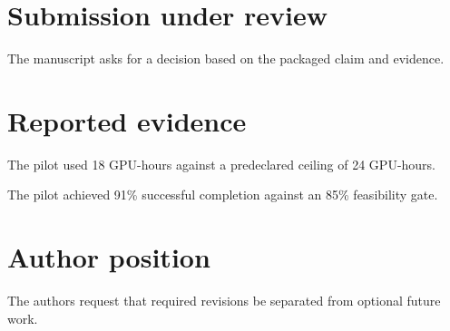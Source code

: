 \documentclass{article}
\begin{document}
\section{Submission under review}
The manuscript asks for a decision based on the packaged claim and evidence.
\section{Reported evidence}
The pilot used 18 GPU-hours against a predeclared ceiling of 24 GPU-hours.

The pilot achieved 91\% successful completion against an 85\% feasibility gate.
\section{Author position}
The authors request that required revisions be separated from optional future work.
\end{document}
